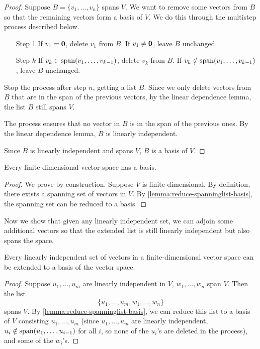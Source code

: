 \begin{proof}
Suppose $B=\{v_1,\dots,v_n\}$ spans $V$. We want to remove some vectors from $B$ so that the remaining vectors form a basis of $V$. We do this through the multistep process described below.

\begin{enumerate}
\item[Step 1] If $v_1=\vb{0}$, delete $v_1$ from $B$. If $v_1\neq\vb{0}$, leave $B$ unchanged.
\item[Step $k$] If $v_k\in\operatorname{span}(v_1,\dots,v_{k-1})$, delete $v_k$ from $B$. If $v_k\notin\operatorname{span}(v_1,\dots,v_{k-1})$, leave $B$ unchanged.
\end{enumerate}

Stop the process after step $n$, getting a list $B$. Since we only delete vectors from $B$ that are in the span of the previous vectors, by the linear dependence lemma, the list $B$ still spans $V$.

The process ensures that no vector in $B$ is in the span of the previous ones. By the linear dependence lemma, $B$ is linearly independent.

Since $B$ is linearly independent and spans $V$, $B$ is a basis of $V$.
\end{proof}

\begin{corollary}\label{cor:basis-fin-dim}
Every finite-dimensional vector space has a basis.
\end{corollary}

\begin{proof}
We prove by construction. Suppose $V$ is finite-dimensional. By definition, there exists a spanning set of vectors in $V$. By \cref{lemma:reduce-spanninglist-basis}, the spanning set can be reduced to a basis.
\end{proof}

Now we show that given any linearly independent set, we can adjoin some additional vectors so that the extended list is still linearly independent but also spans the space.

\begin{lemma}\label{lemma:extend-linind-basis}
Every linearly independent set of vectors in a finite-dimensional vector space can be extended to a basis of the vector space.
\end{lemma}

\begin{proof}
Suppose $u_1,\dots,u_m$ are linearly independent in $V$, $w_1,\dots,w_n$ span $V$. Then the list
\[\{u_1,\dots,u_m,w_1,\dots,w_n\}\]
spans $V$. By \cref{lemma:reduce-spanninglist-basis}, we can reduce this list to a basis of $V$ consisting $u_1,\dots,u_m$ (since $u_1,\dots,u_m$ are linearly independent, $u_i\notin\operatorname{span}(u_1,\dots,u_{i-1})$ for all $i$, so none of the $u_i$'s are deleted in the process), and some of the $w_i$'s.
\end{proof}

